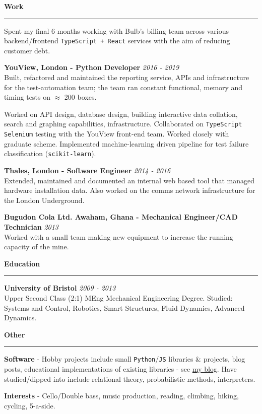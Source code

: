 \documentclass[11pt,a4paper]{article}
\newenvironment{rSection}[1]{
  \smallskip
  {\bf #1}
  \medskip
  \hrule
  \medskip
  \begin{list}{}{
    \setlength{\leftmargin}{1.2em}
  }
  \item[]
}{
  \end{list}
}
\begin{document}
\begin{rSection}{Work}
\par Spent my final 6 months working with Bulb's billing team across various backend/frontend \texttt{TypeScript + React} services with the aim of reducing customer debt.

\smallskip
{\bf YouView, London - Python Developer} \hfill{\em 2016 - 2019} 
\\ Built, refactored and maintained the reporting service, APIs and infrastructure for the test-automation team; the team ran constant functional, memory and timing tests on $\approx$ 200 boxes.

\par  Worked on API design, database design, building interactive data collation, search and graphing capabilities, infrastructure. Collaborated on \texttt{TypeScript} \texttt{Selenium} testing with the YouView front-end team. Worked closely with graduate scheme. Implemented machine-learning driven pipeline for test failure classification (\texttt{scikit-learn}).

\smallskip
\par {\bf Thales, London - Software Engineer} \hfill{\em 2014 - 2016}				    
\\ Extended, maintained and documented an internal web based tool that managed hardware installation data. Also worked on the comms network infrastructure for the London Underground.

\smallskip
\par {\bf Bugudon Cola Ltd. Awaham, Ghana - Mechanical Engineer/CAD Technician} \hfill{\em 2013}
\\ Worked with a small team making new equipment to increase the running capacity of the mine.

\end{rSection}


\begin{rSection}{Education}

{\bf University of Bristol} \hfill{\em 2009 - 2013}
\\ Upper Second Class (2:1) MEng Mechanical Engineering Degree. Studied: Systems and Control, Robotics, Smart Structures, Fluid Dynamics, Advanced Dynamics.

\end{rSection}


\begin{rSection}{Other}

{\bf Software} - Hobby projects include small \texttt{Python}/\texttt{JS} libraries \& projects, blog posts, educational implementations of existing libraries - see \href{https://leontrolski.github.io}{my blog}. Have studied/dipped into include relational theory, probabilistic methods, interpreters.
\par {\bf Interests} - Cello/Double bass, music production, reading, climbing, hiking, cycling, 5-a-side.

\end{rSection}
\end{document}
